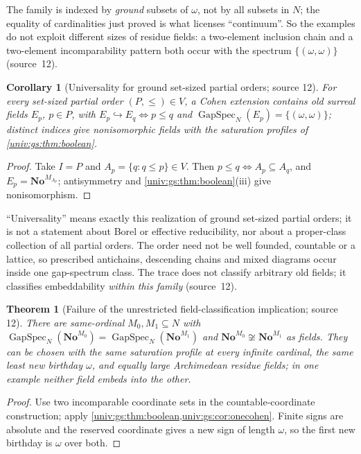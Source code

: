 \documentclass[11pt,letterpaper]{article}
\numberwithin{equation}{section}
\newtheorem{theorem}{Theorem}[section]
\newtheorem{corollary}[corollary]{Corollary}
\theoremstyle{definition}
\theoremstyle{remark}
\newcommand{\No}{\mathbf{No}}
\newcommand{\GapSpec}{\operatorname{GapSpec}}
\begin{document}
The family is indexed by \emph{ground} subsets of $\omega$, not by all subsets in $N$; the
equality of cardinalities just proved is what licenses ``continuum''. So the examples do not
exploit different sizes of residue fields: a two-element inclusion chain and a two-element
incomparability pattern both occur with the spectrum $\{(\omega,\omega)\}$ (source~12).

\begin{corollary}[Universality for ground set-sized partial orders; source 12]\label{univ:gs:cor:poset}
For every set-sized partial order $(P,\le)\in V$, a Cohen extension contains old surreal fields
$E_p$, $p\in P$, with $E_p\hookrightarrow E_q\iff p\le q$ and
$\GapSpec_N(E_p)=\{(\omega,\omega)\}$; distinct indices give nonisomorphic fields with the
saturation profiles of \cref{univ:gs:thm:boolean}.
\end{corollary}
\begin{proof}
Take $I=P$ and $A_p=\{q:q\le p\}\in V$. Then $p\le q\iff A_p\subseteq A_q$, and
$E_p=\No^{M_{A_p}}$; antisymmetry and \cref{univ:gs:thm:boolean}(iii) give nonisomorphism.
\end{proof}

``Universality'' means exactly this realization of ground set-sized partial orders; it is not
a statement about Borel or effective reducibility, nor about a proper-class collection of all
partial orders. The order need not be well founded, countable or a lattice, so prescribed
antichains, descending chains and mixed diagrams occur inside one gap-spectrum class. The
trace does not classify arbitrary old fields; it classifies embeddability \emph{within this
family} (source~12).

\begin{theorem}[Failure of the unrestricted field-classification implication; source 12]\label{univ:gs:thm:incompletetrace}
There are same-ordinal $M_0,M_1\subseteq N$ with
$\GapSpec_N(\No^{M_0})=\GapSpec_N(\No^{M_1})$ and $\No^{M_0}\not\cong\No^{M_1}$ as fields. They
can be chosen with the same saturation profile at every infinite cardinal, the same least new
birthday $\omega$, and equally large Archimedean residue fields; in one example neither field
embeds into the other.
\end{theorem}
\begin{proof}
Use two incomparable coordinate sets in the countable-coordinate construction; apply
\cref{univ:gs:thm:boolean,univ:gs:cor:onecohen}. Finite signs are absolute and the reserved
coordinate gives a new sign of length $\omega$, so the first new birthday is $\omega$ over both.
\end{proof}
\end{document}
